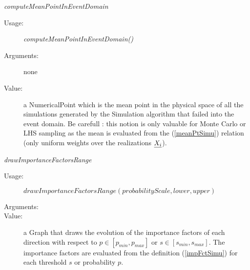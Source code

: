 \begin{description}
\begin{description}
\item \textit{computeMeanPointInEventDomain}
\begin{description}
\item[Usage:] \textit{computeMeanPointInEventDomain()}
\item[Arguments:] none
\item[Value:]  a NumericalPoint which is the mean point in the physical space of all the simulations generated by the Simulation algorithm that failed into the event domain.
Be carefull : this notion is only valuable for Monte Carlo or LHS sampling as the mean is evaluated from the (\ref{meanPtSimu}) relation (only uniform weights over the realizations ${\underline{X_i}}$).
\end{description}
\bigskip

\item \textit{drawImportanceFactorsRange}
\begin{description}
\item[Usage:]  $drawImportanceFactorsRange(probabilityScale, lower,
upper)$

\item[Arguments:] \rule{0pt}{1em}

\item[Value:]  a Graph that draws the evolution of the importance
factors of each direction  with respect to $p\in [p_{min},
p_{max}]$ or $s\in [s_{min},s_{max}]$. The importance factors are
evaluated from the definition (\ref{impFctSimu}) for each
threshold $s$ or probability $p$.
\end{description}

\end{description}

\end{description}
